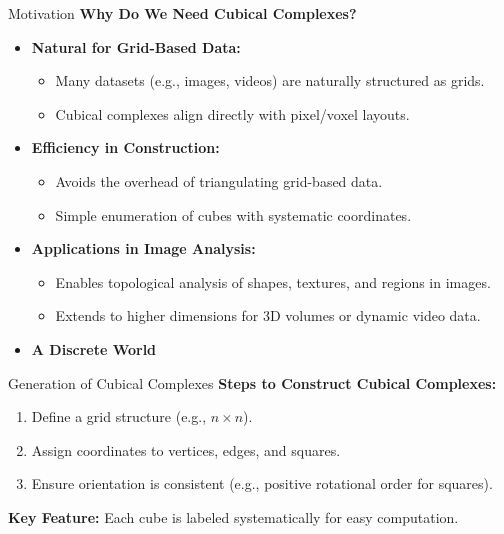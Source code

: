 \documentclass[aspectratio=169,xcolor=dvipsnames]{beamer}
\begin{document}
\begin{frame}{Motivation}
    \textbf{Why Do We Need Cubical Complexes?}
    \begin{itemize}
        \item \textbf{Natural for Grid-Based Data:}
        \begin{itemize}
            \item Many datasets (e.g., images, videos) are naturally structured as grids.
            \item Cubical complexes align directly with pixel/voxel layouts.
        \end{itemize}
        
        \item \textbf{Efficiency in Construction:}
        \begin{itemize}
            \item Avoids the overhead of triangulating grid-based data.
            \item Simple enumeration of cubes with systematic coordinates.
        \end{itemize}
        
        \item \textbf{Applications in Image Analysis:}
        \begin{itemize}
            \item Enables topological analysis of shapes, textures, and regions in images.
            \item Extends to higher dimensions for 3D volumes or dynamic video data.
        \end{itemize}
        
        \item \textbf{A Discrete World}
    \end{itemize}
\end{frame}


\begin{frame}{Generation of Cubical Complexes}
    \textbf{Steps to Construct Cubical Complexes:}
    \begin{enumerate}
        \item Define a grid structure (e.g., \( n \times n \)).
        \item Assign coordinates to vertices, edges, and squares.
        \item Ensure orientation is consistent (e.g., positive rotational order for squares).
    \end{enumerate}

    \vspace{1em}
    \textbf{Key Feature:} Each cube is labeled systematically for easy computation.
\end{frame}
\end{document}

